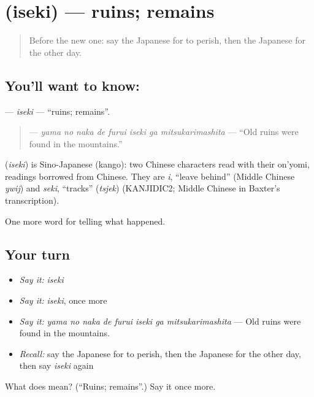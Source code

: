 \section[\texorpdfstring{\ja{いせき} (iseki)}{いせき (iseki)}]{ (iseki) — ruins; remains}

\label{lesson:JA-C313-iseki}



\begin{quote}
Before the new one: say the Japanese for to perish, then the Japanese for the other day.
\end{quote}

\subsection*{You'll want to know: }
\textbf{} — \emph{iseki} — \textquotedblleft{}ruins; remains\textquotedblright{}.

\begin{quote}
\textbf{    } — \emph{yama no naka de furui iseki ga mitsukarimashita} — \textquotedblleft{}Old ruins were found in the mountains.\textquotedblright{}
\end{quote}

\begin{cousinweb}
\textbf{} (\emph{iseki}) is Sino-Japanese (kango): two Chinese characters read with their on'yomi, readings borrowed from Chinese. They are \emph{i}, \textquotedblleft{}leave behind\textquotedblright{} (Middle Chinese \emph{ywij}) and \emph{seki}, \textquotedblleft{}tracks\textquotedblright{} (\emph{tsjek}) (KANJIDIC2; Middle Chinese in Baxter's transcription).
\end{cousinweb}

\begin{grammarlens}[title={What you've built}]
One more word for telling what happened.
\end{grammarlens}

\subsection*{Your turn}
\begin{itemize}
\raggedright
  \item \emph{Say it:} \emph{iseki}
  \item \emph{Say it:} \emph{iseki}, once more
  \item \emph{Say it:} \emph{yama no naka de furui iseki ga mitsukarimashita} — Old ruins were found in the mountains.
  \item \emph{Recall:} say the Japanese for to perish, then the Japanese for the other day, then say \emph{iseki} again
\end{itemize}

\begin{tcolorbox}[breakable,colback=teal!4,colframe=teal!35!black,title={Before you move on}]
What does  mean? (\textquotedblleft{}Ruins; remains\textquotedblright{}.) Say it once more.
\end{tcolorbox}

